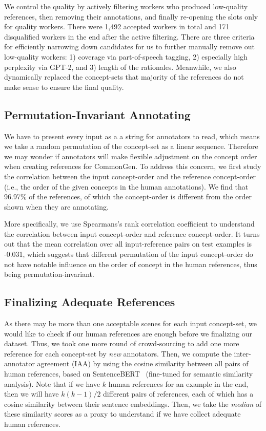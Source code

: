 \documentclass[11pt,a4paper]{article}
\begin{document}
    We control the quality by actively filtering workers who produced low-quality references, then removing their annotations, and finally re-opening the slots only for quality workers. {There were 1,492 accepted workers in total and 171 disqualified workers in the end after the active filtering.}
    There are three criteria for efficiently narrowing down candidates for us to further manually remove out low-quality workers: 1) coverage via part-of-speech tagging, 2) especially high perplexity via GPT-2, and 3) length of the rationales.
    Meanwhile, we also dynamically replaced the concept-sets that majority of the references do not make sense to ensure the final quality.
    
    \subsection{Permutation-Invariant Annotating}
    We have to present every input as a a string for annotators to read, which means we take a random permutation of the concept-set as a linear sequence. Therefore we may wonder if annotators will make flexible adjustment on the concept order when creating references for CommonGen.
	To address this concern, 
	we first study the correlation between the input concept-order and the reference concept-order (i.e., the order of the given concepts in the human annotations).
	We find that 96.97\% of the references, of which the concept-order is different from the order shown when they are annotating.
	
    More specifically, 
    we use Spearmans's rank correlation coefficient to understand the correlation between input concept-order and reference concept-order.
    It turns out that the mean correlation over all input-reference pairs on test examples is -0.031, which suggests that different permutation of the input concept-order do not have notable influence on the order of concept in the human references, thus being permutation-invariant.
	
	\subsection{Finalizing Adequate References}
	As there may be more than one acceptable scenes for each input concept-set, we would like to check if our human references are enough before we finalizing our dataset.
	Thus, we took one more round of crowd-sourcing to add one more reference for each concept-set by \textit{new} annotators.
	Then, we compute the inter-annotator agreement (IAA) by using the cosine similarity between all pairs of human references, based on SentenceBERT~\cite{reimers-gurevych-2019-sentence} (fine-tuned for semantic similarity analysis).
	Note that if we have $k$ human references for an example in the end, then we will have $k(k-1)/2$ different pairs of references, each of which has a cosine similarity between their sentence embeddings.
	Then, we take the \textit{median} of these similarity scores as a proxy to understand if we have collect adequate human references.
	
\end{document}
